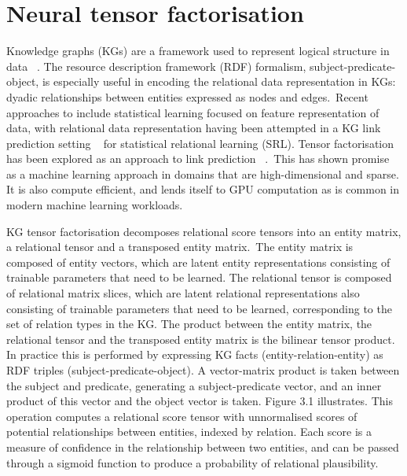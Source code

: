 \chapter{Neural tensor factorisation}


\ifpdf
     \graphicspath{{Figs/Chapter3/}}
\else
    \graphicspath{{Chapter3/Figs/Vector/}{Chapter3/Figs/}}
\fi

Knowledge graphs (KGs) are a framework used to represent logical structure in data \unskip ~\citep{koller2007introduction}. The resource description framework (RDF) formalism, subject-predicate-object, is especially useful in encoding the relational data representation in KGs: dyadic relationships between entities expressed as nodes and edges.\ Recent approaches to include statistical learning focused on feature representation of data, with relational data representation having been attempted in a KG link prediction setting \unskip~\citep{kazemi2018simple, chang2014typed, kang2012gigatensor} for statistical relational learning (SRL). Tensor factorisation has been explored as an approach to link prediction \unskip ~\citep{nickel2011three, bordes2013translating, trouillon2016complex}.\ This has shown promise as a machine learning approach in domains that are high-dimensional and sparse. It is also compute efficient, and lends itself to GPU computation as is common in modern machine learning workloads. \par

\noindent KG tensor factorisation decomposes relational score tensors into an entity matrix, a relational tensor and a transposed entity matrix.\ The entity matrix is composed of entity vectors, which are latent entity representations consisting of trainable parameters that need to be learned. The relational tensor is composed of relational matrix slices, which are latent relational representations also consisting of trainable parameters that need to be learned, corresponding to the set of relation types in the KG. The product between the entity matrix, the relational tensor and the transposed entity matrix is the bilinear tensor product. In practice this is performed by expressing KG facts (entity-relation-entity) as RDF triples (subject-predicate-object). A vector-matrix product is taken between the subject and predicate, generating a subject-predicate vector, and an inner product of this vector and the object vector is taken. Figure 3.1 illustrates. This operation computes a relational score tensor with unnormalised scores of potential relationships between entities, indexed by relation. Each score is a measure of confidence in the relationship between two entities, and can be passed through a sigmoid function to produce a probability of relational plausibility. \par

